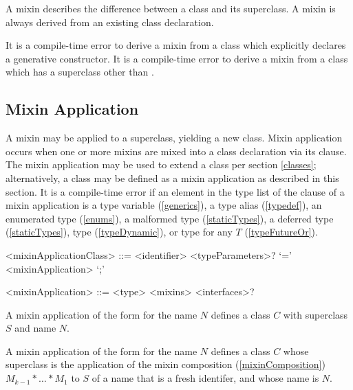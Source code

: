 \documentclass[makeidx]{article}
\begin{document}
\LMHash{}%
A mixin describes the difference between a class and its superclass.
A mixin is always derived from an existing class declaration.

\LMHash{}%
It is a compile-time error to derive a mixin from a class which explicitly declares a generative constructor.
It is a compile-time error to derive a mixin from a class which has a superclass other than .



\subsection{Mixin Application}

\LMHash{}%
A mixin may be applied to a superclass, yielding a new class.
Mixin application occurs when one or more mixins are mixed into a class declaration via its \WITH{} clause.
The mixin application may be used to extend a class per section \ref{classes};
alternatively, a class may be defined as a mixin application as described in this section.
It is a compile-time error if an element in the type list of the \WITH{} clause of a mixin application is
a type variable (\ref{generics}), a type alias (\ref{typedef}),
an enumerated type (\ref{enums}), a malformed type (\ref{staticTypes}),
a deferred type (\ref{staticTypes}), type \DYNAMIC{} (\ref{typeDynamic}),
or type  for any $T$ (\ref{typeFutureOr}).

\begin{grammar}
<mixinApplicationClass> ::= \gnewline{}
  <identifier> <typeParameters>? `=' <mixinApplication> `;'

<mixinApplication> ::= <type> <mixins> <interfaces>?
\end{grammar}

\LMHash{}%
A mixin application of the form  for the name $N$ defines a class $C$ with superclass $S$ and name $N$.

\LMHash{}%
A mixin application of the form  for the name $N$ defines a class $C$ whose superclass is the application of the mixin composition (\ref{mixinComposition}) $M_{k-1} * \ldots * M_1$ to $S$ of a name that is a fresh identifer, and whose name is $N$.
\end{document}
